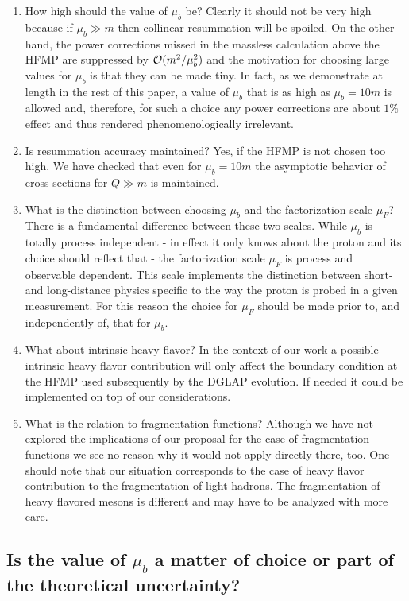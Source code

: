 \documentclass[letter,11pt]{article}
\newcommand{\muF}{\mu_F}
\def\mub{\mu_b}
\begin{document}
\begin{enumerate}
%
\item How high should the value of $\mub$ be? Clearly it should not be very high because if $\mub\gg m$ then collinear resummation will be spoiled. On the other hand, the power corrections missed 
in the massless calculation above the HFMP are suppressed by ${\cal O}(m^2/\mub^2)$ and the motivation for choosing large values for $\mub$ is that they can be made tiny. In fact, as we demonstrate at length in the rest of this paper, a value of $\mub$ that is as high as $\mub=10 m$ is allowed and, therefore, for such a choice any power corrections are about $1\%$ effect and thus rendered phenomenologically irrelevant. 
%
\item Is resummation accuracy maintained? Yes, if the HFMP is not chosen too high. We have checked that even for $\mub=10 m$ the asymptotic behavior of cross-sections for $Q\gg m$ is maintained.
%
\item What is the distinction between choosing $\mub$ and the factorization scale $\muF$? There is a fundamental difference between these two scales. While $\mub$ is totally process independent - in effect it only knows about the proton and its choice should reflect that - the factorization scale $\muF$ is process and observable dependent. This scale implements the distinction between short- and long-distance physics specific to the way the proton is probed in a given measurement. For this reason the choice for $\muF$ should be made prior to, and independently of, that for $\mub$.
%
\item What about intrinsic heavy flavor? In the context of our work a possible intrinsic heavy flavor contribution will only affect the boundary condition at the HFMP used subsequently by the DGLAP evolution. If needed it could be implemented on top of our considerations. 
%
\item What is the relation to fragmentation functions? Although we have not explored the implications of our proposal for the case of fragmentation functions we see no reason why it would not apply directly there, too. One should note that our situation corresponds to the case of heavy flavor contribution to the fragmentation of light hadrons. The fragmentation of heavy flavored mesons is different and may have to be analyzed with more care.
%
\end{enumerate}
%



\subsection{Is the value of $\mub$ a matter of choice or part of the theoretical uncertainty?}\label{sec:mubchoice}
\end{document}
